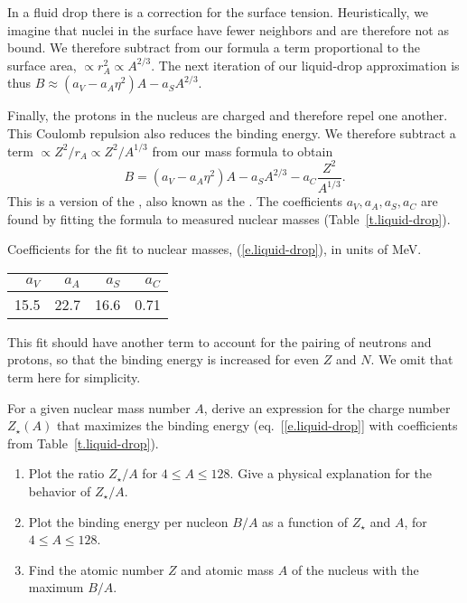 In a fluid drop there is a correction for the surface tension. Heuristically, we imagine that nuclei in the surface have fewer neighbors and are therefore not as bound. We therefore subtract from our formula a term proportional to the surface area, $\propto r_{A}^{2} \propto A^{2/3}$. The next iteration of our liquid-drop approximation is thus $B \approx (a_{V}- a_{A}\eta^{2})A - a_{S}A^{2/3} $.

Finally, the protons in the nucleus are charged and therefore repel one another. This Coulomb repulsion also reduces the binding energy. We therefore subtract a term $\propto Z^{2}/r_{A}\propto Z^{2}/A^{1/3}$ from our mass formula to obtain
\begin{equation}\label{e.liquid-drop}
B = \left(a_{V} -a_{A}\eta^{2}\right) A -  a_{S}A^{2/3} - a_{C} \frac{Z^{2}}{A^{1/3}}. 
\end{equation}
This is a version of the , also known as the .
The coefficients $a_{V},a_{A},a_{S},a_{C}$ are found by fitting the formula to measured nuclear masses (Table~\ref{t.liquid-drop}).
\begin{margintable}
\caption[Liquid-drop coefficients]{\label{t.liquid-drop} Coefficients for the fit to nuclear masses, (\protect\ref{e.liquid-drop}), in units of MeV.}
\begin{tabular}{rrrr}
$a_V$ & $a_A$ & $a_S$ & $a_C$ \\
\hline
15.5 & 22.7 & 16.6 & 0.71\\
\end{tabular}
\end{margintable}
\noindent This fit should have another term to account for the pairing of neutrons and protons, so that the binding energy is increased for even $Z$ and $N$. We omit that term here for simplicity.

\begin{exercisebox}
\label{ex.nuclear-landscape}
For a given nuclear mass number $A$, derive an expression for the charge number $Z_{\star}(A)$ that maximizes the binding energy (eq.~[\ref{e.liquid-drop}] with coefficients from Table~\ref{t.liquid-drop}).
\begin{enumerate}
\item Plot the ratio $Z_{\star}/A$ for $4\le A\le 128$. Give a physical explanation for the behavior of $Z_{\star}/A$.
\item Plot the binding energy per nucleon $B/A$ as a function of $Z_{\star}$ and $A$, for $4\le A\le 128$.
\item Find the atomic number $Z$ and atomic mass $A$ of the nucleus with the maximum $B/A$.
\end{enumerate}
\end{exercisebox}

